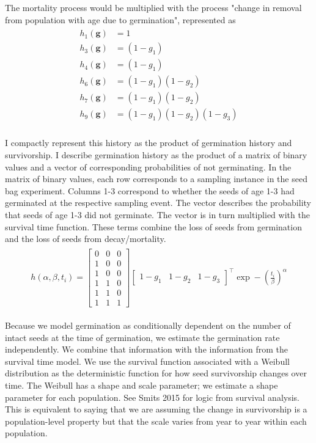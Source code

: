 \documentclass[12pt, oneside, titlepage]{article}   	%
\begin{document}
The mortality process would be multiplied with the process "change in removal from population with age due to germination", represented as
%
\begin{align}
  \begin{split}
h_1(\bm{g}) & = 1 \\
h_3(\bm{g}) & = (1-g_1) \\
h_4(\bm{g}) & = (1-g_1) \\
h_6(\bm{g}) & = (1-g_1) (1- g_2) \\
h_7(\bm{g}) & = (1-g_1) (1- g_2) \\
h_9(\bm{g}) & = (1-g_1) (1- g_2) (1-g_3) \\
  \end{split}
\end{align}
% 

I compactly represent this history as the product of germination history and survivorship. I describe germination history as the product of a matrix of binary values and a vector of corresponding probabilities of not germinating. In the matrix of binary values, each row corresponds to a sampling instance in the seed bag experiment. Columns 1-3 correspond to whether the seeds of age 1-3 had germinated at the respective sampling event. The vector describes the probability that seeds of age 1-3 did not germinate. The vector is in turn multiplied with the survival time function. These terms combine the loss of seeds from germination and the loss of seeds from decay/mortality.
%
\begin{align}
  \begin{split}
  h(\alpha,\beta,t_i) = 
\begin{bmatrix}
0 & 0 & 0\\
1 & 0 & 0\\
1 & 0 & 0\\
1 & 1 & 0\\
1 & 1 & 0\\
1 & 1 & 1
\end{bmatrix}
\begin{bmatrix}
1-g_1 & 1-g_2 & 1-g_3
\end{bmatrix}^\top
\exp-(\frac{t_i}{\beta})^\alpha
  \end{split}
\end{align}

Because we model germination as conditionally dependent on the number of intact seeds at the time of germination, we estimate the germination rate independently. We combine that information with the information from the survival time model. We use the survival function associated with a Weibull distribution as the deterministic function for how seed survivorship changes over time. The Weibull has a shape and scale parameter; we estimate a shape parameter for each population. See Smits 2015 for logic from survival analysis.  This is equivalent to saying that we are assuming the change in survivorship is a population-level property but that the scale varies from year to year within each population. 
\end{document}
